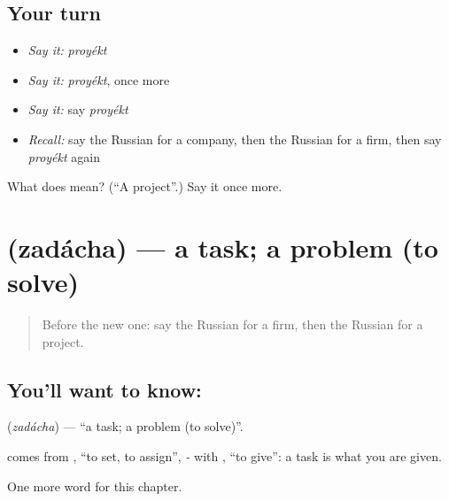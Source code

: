\subsection*{Your turn}
\begin{itemize}
\raggedright
  \item \emph{Say it:} \emph{proyékt}
  \item \emph{Say it:} \emph{proyékt}, once more
  \item \emph{Say it:} say \emph{proyékt}
  \item \emph{Recall:} say the Russian for a company, then the Russian for a firm, then say \emph{proyékt} again
\end{itemize}

\begin{tcolorbox}[breakable,colback=teal!4,colframe=teal!35!black,title={Before you move on}]
What does  mean? (\textquotedblleft{}A project\textquotedblright{}.) Say it once more.
\end{tcolorbox}
\section[\texorpdfstring{\ru{задача} (zadácha)}{задача (zadácha)}]{ (zadácha) — a task; a problem (to solve)}

\label{lesson:RU-C257-zadacha}



\begin{quote}
Before the new one: say the Russian for a firm, then the Russian for a project.
\end{quote}

\subsection*{You'll want to know: }
\textbf{} (\emph{zadácha}) — \textquotedblleft{}a task; a problem (to solve)\textquotedblright{}.

\begin{cousinweb}
\textbf{} comes from \emph{}, \textquotedblleft{}to set, to assign\textquotedblright{}, \emph{-} with \emph{}, \textquotedblleft{}to give\textquotedblright{}: a task is what you are given.
\end{cousinweb}

\begin{grammarlens}[title={What you've built}]
One more word for this chapter.
\end{grammarlens}

